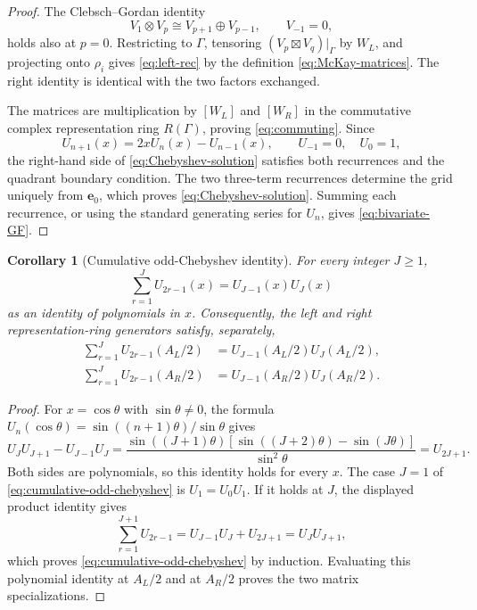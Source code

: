 \documentclass[11pt]{article}
\newtheorem{corollary}[theorem]{Corollary}
\theoremstyle{definition}
\begin{document}
\begin{proof}
The Clebsch--Gordan identity
\[
 V_1\otimes V_p\cong V_{p+1}\oplus V_{p-1},
 \qquad V_{-1}=0,
\]
holds also at $p=0$.  Restricting to $\Gamma$, tensoring
$(V_p\boxtimes V_q)|_\Gamma$ by $W_L$, and projecting onto $\rho_i$
gives \eqref{eq:left-rec} by the definition
\eqref{eq:McKay-matrices}.  The right identity is identical with the
two factors exchanged.

The matrices are multiplication by $[W_L]$ and $[W_R]$ in the
commutative complex representation ring $R(\Gamma)$, proving
\eqref{eq:commuting}.  Since
\[
 U_{n+1}(x)=2xU_n(x)-U_{n-1}(x),
 \qquad U_{-1}=0,\quad U_0=1,
\]
the right-hand side of \eqref{eq:Chebyshev-solution} satisfies both
recurrences and the quadrant boundary condition.  The two three-term
recurrences determine the grid uniquely from $\boldsymbol e_0$, which
proves \eqref{eq:Chebyshev-solution}.  Summing each recurrence, or using
the standard generating series for $U_n$, gives
\eqref{eq:bivariate-GF}.
\end{proof}

\begin{corollary}[Cumulative odd-Chebyshev identity]
\label{cor:cumulative-odd-chebyshev}
For every integer $J\geq1$,
\begin{equation}
 \sum_{r=1}^{J}U_{2r-1}(x)=U_{J-1}(x)U_J(x)
 \label{eq:cumulative-odd-chebyshev}
\end{equation}
as an identity of polynomials in $x$.  Consequently, the left and right
representation-ring generators satisfy, separately,
\begin{align}
 \sum_{r=1}^{J}U_{2r-1}(A_L/2)
 &=U_{J-1}(A_L/2)U_J(A_L/2),
 \label{eq:cumulative-odd-chebyshev-left}\\
 \sum_{r=1}^{J}U_{2r-1}(A_R/2)
 &=U_{J-1}(A_R/2)U_J(A_R/2).
 \label{eq:cumulative-odd-chebyshev-right}
\end{align}
\end{corollary}

\begin{proof}
For $x=\cos\theta$ with $\sin\theta\ne0$, the formula
$U_n(\cos\theta)=\sin((n+1)\theta)/\sin\theta$ gives
\[
 U_JU_{J+1}-U_{J-1}U_J
 =\frac{\sin((J+1)\theta)
 [\sin((J+2)\theta)-\sin(J\theta)]}{\sin^2\theta}
 =U_{2J+1}.
\]
Both sides are polynomials, so this identity holds for every $x$.  The
case $J=1$ of \eqref{eq:cumulative-odd-chebyshev} is $U_1=U_0U_1$.
If it holds at $J$, the displayed product identity gives
\[
 \sum_{r=1}^{J+1}U_{2r-1}
 =U_{J-1}U_J+U_{2J+1}=U_JU_{J+1},
\]
which proves \eqref{eq:cumulative-odd-chebyshev} by induction.  Evaluating
this polynomial identity at $A_L/2$ and at $A_R/2$ proves the two matrix
specializations.
\end{proof}
\end{document}
